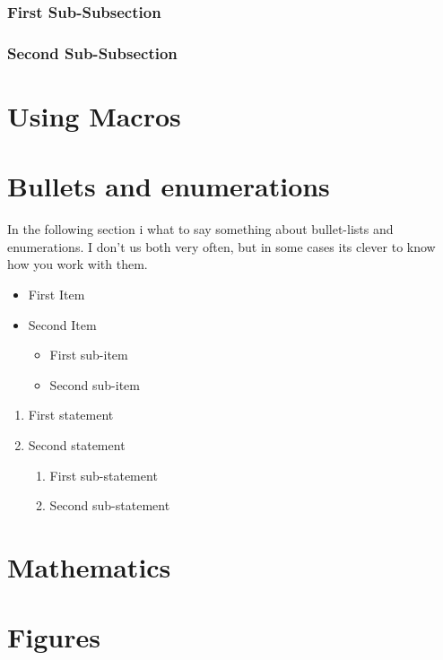 \documentclass[11pt, a4paper]{article}
\begin{document}
\subsubsection{First Sub-Subsection}

\subsubsection{Second Sub-Subsection}

\section{Using Macros}

\section{Bullets and enumerations}

In the following section i what to say something about bullet-lists and enumerations. I don't us both very often, but in some cases its clever to know how you work with them.

\begin{itemize}
	\item First Item
	\item Second Item
		\begin{itemize}
			\item First sub-item
			\item Second sub-item
		\end{itemize}
\end{itemize}

\begin{enumerate}
	\item First statement
	\item Second statement
		\begin{enumerate}
			\item First sub-statement
			\item Second sub-statement
		\end{enumerate}
\end{enumerate}

\section{Mathematics}

\section{Figures}
\end{document}
